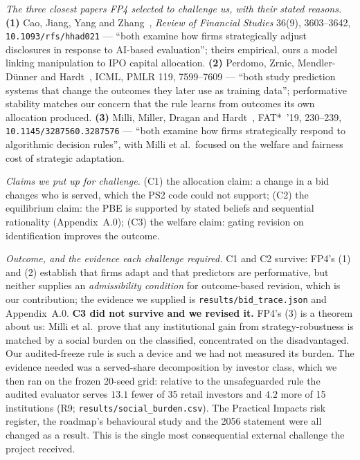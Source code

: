 \emph{The three closest papers FP4 selected to challenge us, with their stated reasons.} \textbf{(1)} Cao, Jiang, Yang and Zhang~\cite{cao2023machine}, \emph{Review of Financial Studies} 36(9), 3603--3642, \texttt{10.1093/rfs/hhad021} --- ``both examine how firms strategically adjust disclosures in response to AI-based evaluation''; theirs empirical, ours a model linking manipulation to IPO capital allocation. \textbf{(2)} Perdomo, Zrnic, Mendler-D\"unner and Hardt~\cite{perdomo2020}, ICML, PMLR 119, 7599--7609 --- ``both study prediction systems that change the outcomes they later use as training data''; performative stability matches our concern that the rule learns from outcomes its own allocation produced. \textbf{(3)} Milli, Miller, Dragan and Hardt~\cite{milli2019}, FAT*~'19, 230--239, \texttt{10.1145/3287560.3287576} --- ``both examine how firms strategically respond to algorithmic decision rules'', with Milli et al.\ focused on the welfare and fairness cost of strategic adaptation.

\emph{Claims we put up for challenge.} (C1) the allocation claim: a change in a bid changes who is served, which the PS2 code could not support; (C2) the equilibrium claim: the PBE is supported by stated beliefs and sequential rationality (Appendix~A.0); (C3) the welfare claim: gating revision on identification improves the outcome.

\emph{Outcome, and the evidence each challenge required.} C1 and C2 survive: FP4's (1) and (2) establish that firms adapt and that predictors are performative, but neither supplies an \emph{admissibility condition} for outcome-based revision, which is our contribution; the evidence we supplied is \texttt{results/bid\_trace.json} and Appendix~A.0. \textbf{C3 did not survive and we revised it.} FP4's (3) is a theorem about us: Milli et al.\ prove that any institutional gain from strategy-robustness is matched by a social burden on the classified, concentrated on the disadvantaged. Our audited-freeze rule is such a device and we had not measured its burden. The evidence needed was a served-share decomposition by investor class, which we then ran on the frozen 20-seed grid: relative to the unsafeguarded rule the audited evaluator serves $13.1$ fewer of 35 retail investors and $4.2$ more of 15 institutions (R9; \texttt{results/social\_burden.csv}). The Practical Impacts risk register, the roadmap's behavioural study and the 2056 statement were all changed as a result. This is the single most consequential external challenge the project received.

